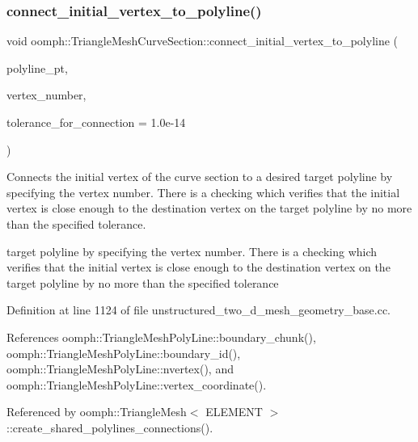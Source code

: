 \subsubsection{\texorpdfstring{connect\+\_\+initial\+\_\+vertex\+\_\+to\+\_\+polyline()}{connect\_initial\_vertex\_to\_polyline()}}
{\footnotesize\ttfamily void oomph\+::\+Triangle\+Mesh\+Curve\+Section\+::connect\+\_\+initial\+\_\+vertex\+\_\+to\+\_\+polyline (\begin{DoxyParamCaption}\item[{\hyperlink{classoomph_1_1TriangleMeshPolyLine}{Triangle\+Mesh\+Poly\+Line} $\ast$}]{polyline\+\_\+pt,  }\item[{const unsigned \&}]{vertex\+\_\+number,  }\item[{const double \&}]{tolerance\+\_\+for\+\_\+connection = {\ttfamily 1.0e-\/14} }\end{DoxyParamCaption})}



Connects the initial vertex of the curve section to a desired target polyline by specifying the vertex number. There is a checking which verifies that the initial vertex is close enough to the destination vertex on the target polyline by no more than the specified tolerance. 

target polyline by specifying the vertex number. There is a checking which verifies that the initial vertex is close enough to the destination vertex on the target polyline by no more than the specified tolerance 

Definition at line 1124 of file unstructured\+\_\+two\+\_\+d\+\_\+mesh\+\_\+geometry\+\_\+base.\+cc.



References oomph\+::\+Triangle\+Mesh\+Poly\+Line\+::boundary\+\_\+chunk(), oomph\+::\+Triangle\+Mesh\+Poly\+Line\+::boundary\+\_\+id(), oomph\+::\+Triangle\+Mesh\+Poly\+Line\+::nvertex(), and oomph\+::\+Triangle\+Mesh\+Poly\+Line\+::vertex\+\_\+coordinate().



Referenced by oomph\+::\+Triangle\+Mesh$<$ E\+L\+E\+M\+E\+N\+T $>$\+::create\+\_\+shared\+\_\+polylines\+\_\+connections().

\mbox{\label{classoomph_1_1TriangleMeshCurveSection_a88a139cf580b5cd694dd2a69ef372a0d}} 
